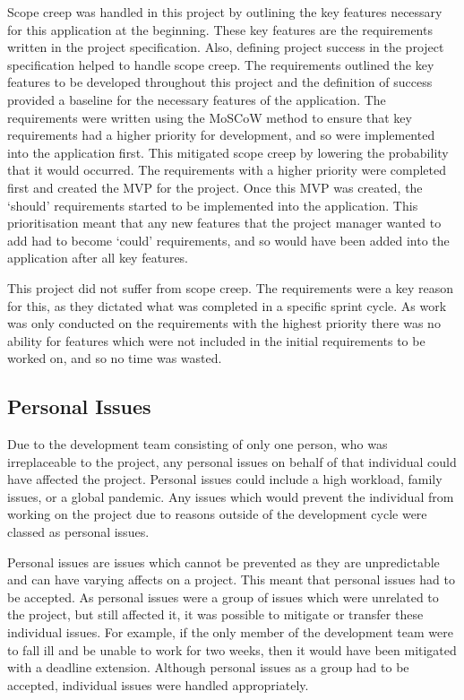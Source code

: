 \documentclass{article}
\begin{document}
Scope creep was handled in this project by outlining the key features necessary for this application at the beginning. These key features are the requirements written in the project specification. Also, defining project success in the project specification helped to handle scope creep. The requirements outlined the key features to be developed throughout this project and the definition of success provided a baseline for the necessary features of the application. The requirements were written using the MoSCoW method to ensure that key requirements had a higher priority for development, and so were implemented into the application first. This mitigated scope creep by lowering the probability that it would occurred. The requirements with a higher priority were completed first and created the MVP for the project. Once this MVP was created, the `should' requirements started to be implemented into the application. This prioritisation meant that any new features that the project manager wanted to add had to become `could' requirements, and so would have been added into the application after all key features. \par

This project did not suffer from scope creep. The requirements were a key reason for this, as they dictated what was completed in a specific sprint cycle. As work was only conducted on the requirements with the highest priority there was no ability for features which were not included in the initial requirements to be worked on, and so no time was wasted. \par

\subsection{Personal Issues}

Due to the development team consisting of only one person, who was irreplaceable to the project, any personal issues on behalf of that individual could have affected the project. Personal issues could include a high workload, family issues, or a global pandemic. Any issues which would prevent the individual from working on the project due to reasons outside of the development cycle were classed as personal issues. \par

Personal issues are issues which cannot be prevented as they are unpredictable and can have varying affects on a project. This meant that personal issues had to be accepted. As personal issues were a group of issues which were unrelated to the project, but still affected it, it was possible to mitigate or transfer these individual issues. For example, if the only member of the development team were to fall ill and be unable to work for two weeks, then it would have been mitigated with a deadline extension. Although personal issues as a group had to be accepted, individual issues were handled appropriately. \par
\end{document}
